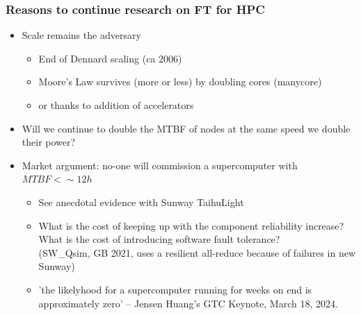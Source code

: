 \begin{frame}
  \frametitle{Reasons to continue research on FT for HPC}

  \begin{itemize}
  \item Scale remains the adversary
    \begin{itemize}
    \item End of Dennard scaling (ca 2006)
    \item Moore's Law survives (more or less) by doubling cores (manycore)
    \item or thanks to addition of accelerators
    \end{itemize}
  \item \quesley Will we continue to double the MTBF of nodes at the same speed we double their power?
  \item \quesley Market argument: no-one will commission a supercomputer with $MTBF < \sim 12h$
    \begin{itemize}
    \item \frownie See anecdotal evidence with Sunway TaihuLight
    \item \smiley What is the cost of keeping up with the component reliability increase?\\
      What is the cost of introducing software fault tolerance?\\
      (SW\_Qsim, GB 2021, uses a resilient all-reduce because of failures in new Sunway)
    \item \smiley 'the likelyhood for a supercomputer running for weeks on end is approximately zero' -- Jensen Huang's GTC Keynote, March 18, 2024.
    \end{itemize}
  \end{itemize}
\end{frame}

